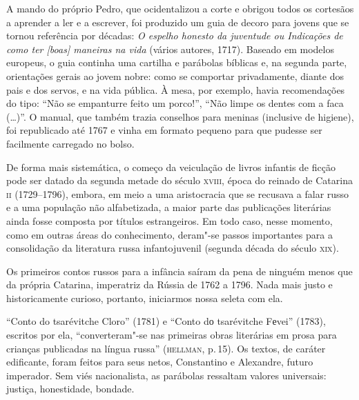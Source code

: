 A mando do próprio Pedro, que ocidentalizou a corte e obrigou todos os
cortesãos a aprender a ler e a escrever, foi produzido um guia de decoro
para jovens que se tornou referência por décadas: \emph{O espelho
honesto da juventude ou Indicações de como ter {[}boas{]} maneiras na
vida} (vários autores, 1717). Baseado em modelos europeus, o guia
continha uma cartilha e parábolas bíblicas e, na segunda parte,
orientações gerais ao jovem nobre: como se comportar privadamente,
diante dos pais e dos servos, e na vida pública. À mesa, por exemplo,
havia recomendações do tipo: ``Não se empanturre feito um porco!'',
``Não limpe os dentes com a faca (\ldots{})''. O manual, que também
trazia conselhos para meninas (inclusive de higiene), foi republicado
até 1767 e vinha em formato pequeno para que pudesse ser facilmente
carregado no bolso.

De forma mais sistemática, o começo da veiculação de livros infantis de
ficção pode ser datado da segunda metade do século \textsc{xviii}, época do
reinado de Catarina \textsc{ii} (1729--1796), embora, em meio a uma aristocracia
que se recusava a falar russo e a uma população não alfabetizada, a
maior parte das publicações literárias ainda fosse composta por títulos
estrangeiros. Em todo caso, nesse momento, como em outras áreas do
conhecimento, deram"-se passos importantes para a consolidação da
literatura russa infantojuvenil (segunda década do
século \textsc{xix}).

Os primeiros contos russos para a infância saíram da pena de ninguém menos
que da própria Catarina, imperatriz da Rússia de 1762 a
1796. Nada mais justo e historicamente curioso, portanto, iniciarmos
nossa seleta com ela.

``Conto do tsarévitche Cloro'' (1781) e ``Conto dо
tsarévitche Fеvei'' (1783), escritos por ela, ``converteram"-se
nas primeiras obras literárias em prosa para crianças publicadas na
língua russa'' (\textsc{hellman}, p.\,15). Os textos, de caráter edificante, foram
feitos para seus netos, Constantino e Alexandre, futuro imperador. Sem
viés nacionalista, as parábolas ressaltam valores universais: justiça,
honestidade, bondade.


